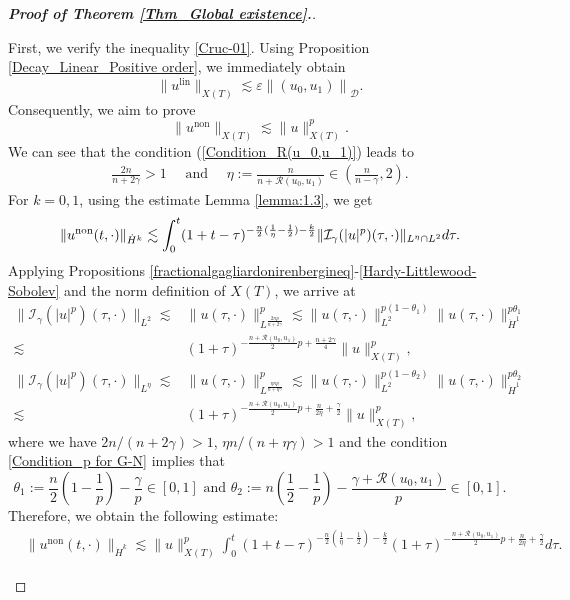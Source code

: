 \documentclass[11pt,reqno]{amsart}
\begin{document}
\begin{proof}[\textbf{Proof of Theorem \ref{Thm_Global existence}.}]
\begin{itemize}
First, we verify the inequality \eqref{Cruc-01}. Using Proposition \ref{Decay_Linear_Positive order}, we immediately obtain $$\|u^{\text{lin}}\|_{X(T)}\lesssim\varepsilon\left\|\left(u_0, u_1\right)\right\|_{\mathcal{D}}.$$ Consequently, we aim to prove
\begin{equation}\label{Crucial_03}
\|u^{\text{non}}\|_{X(T)}\lesssim\|u\|_{X(T)}^p.
\end{equation}
We can see that the condition (\ref{Condition_R(u_0,u_1)}) leads to
\begin{align*}
    \frac{2n}{n+2\gamma} > 1 \quad\text{ and }\quad \eta := \frac{n}{n+\mathcal{R}(u_0, u_1)} \in \left(\frac{n}{n-\gamma},2\right).
\end{align*}
For $k = 0,1$, using the estimate Lemma \ref{lemma:1.3}, we get
$$
\|u^{\rm non}(t,\cdot)\|_{\dot{H}^k} \lesssim \int_0^t (1+t-\tau)^{-\frac{n}{2}(\frac{1}{\eta}-\frac{1}{2})-\frac{k}{2}} \|\mathcal{I}_\gamma(|u|^p)(\tau,\cdot)\|_{L^{\eta} \cap L^2} d\tau.
$$
 Applying Propositions \ref{fractionalgagliardonirenbergineq}-\ref{Hardy-Littlewood-Sobolev} and the norm definition of $X(T)$, we arrive at
\begin{align*}
\|\mathcal{I}_\gamma(|u|^p)(\tau,\cdot)\|_{L^2}\lesssim &\|u(\tau, \cdot)\|_{L^{\frac{2np}{n+2\gamma}}}^p \lesssim \|u(\tau,\cdot)\|^{p(1-\theta_1)}_{L^2}\|u(\tau,\cdot)\|^{p\theta_1}_{\dot{H}^1}\\
\lesssim & (1+\tau)^{-\frac{n+\mathcal{R}(u_0, u_1)}{2} p+\frac{n+2\gamma}{4}}\|u\|_{X(T)}^p, \\ 
\| \mathcal{I}_\gamma(|u|^p)(\tau,\cdot)\|_{L^{\eta}}\lesssim & \|u(\tau, \cdot)\|_{L^{\frac{\eta np}{n+\eta\gamma}}}^p \lesssim \|u(\tau,\cdot)\|^{p(1-\theta_2)}_{L^2}\|u(\tau,\cdot)\|^{p\theta_2}_{\dot{H}^1}\\
\lesssim & (1+\tau)^{-\frac{n+\mathcal{R}(u_0, u_1)}{2}p+\frac{n}{2\eta}+\frac{\gamma}{2}}\|u\|_{X(T)}^p, 
\end{align*}
where we have $2n/(n+2\gamma) > 1$, $\eta n/(n+\eta \gamma) > 1$ and  the condition \eqref{Condition_p for G-N} implies that
$$
\theta_1:= \frac{n}{2}\left(1-\frac{1}{p}\right)-\frac{\gamma}{p} \in [0,1] \text{ and } \theta_2:=n\left(\frac{1}{2}-\frac{1}{p}\right)-\frac{\gamma+\mathcal{R}(u_0, u_1)}{p} \in [0,1].
$$
Therefore, we obtain the following estimate:
\begin{align*}
&\|u^{\text{non}}(t,\cdot)\|_{\dot{H}^k} 
\lesssim  \|u\|^p_{X(T)} \int_0^t(1+t-\tau)^{-\frac{n}{2}(\frac{1}{\eta}-\frac{1}{2})-\frac{k}{2}}(1+\tau)^{-\frac{n+\mathcal{R}(u_0, u_1)}{2}p+\frac{n}{2\eta}+\frac{\gamma}{2}}d\tau.

\end{align*}
\end{itemize}
\end{proof}
\end{document}
